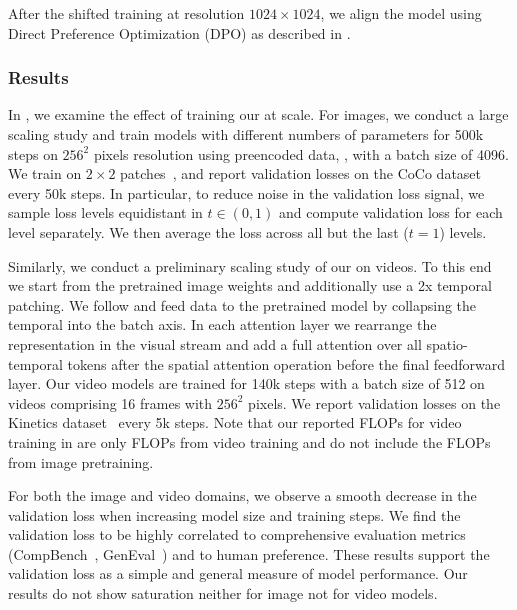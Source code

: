 After the shifted training at resolution $1024 \times 1024$, we align the model
using Direct Preference Optimization (DPO) as described in
.

\subsubsection{Results}\label{subsec:results}
%
%
%
\figvalscaling
In , we examine the effect of training our \modelname at scale. For images, we conduct a large scaling study and train models with different numbers of parameters for 500k steps on $256^2$ pixels resolution using preencoded data, \cf {}, with a batch size of 4096. We train on $2\times2$ patches~\citep{Peebles_2023}, and report validation losses on the CoCo dataset~\citep{Lin_2014} every 50k steps. In particular, to reduce noise in the validation loss signal, we sample loss levels equidistant in $t \in (0,1)$ and compute validation loss for each level separately. We then average the loss across all but the last ($t=1$) levels.

Similarly, we conduct a preliminary scaling study of our \modelname on videos.
To this end we start from the pretrained image weights and additionally use a
2x temporal patching. We follow \citet{blattmann2023align} and feed data to the
pretrained model by collapsing the temporal into the batch axis. In each
attention layer we rearrange the representation in the visual stream and add a
full attention over all spatio-temporal tokens after the spatial attention
operation before the final feedforward layer. Our video models are trained for
140k steps with a batch size of 512 on videos comprising 16 frames with $256^2$
pixels. We report validation losses on the Kinetics
dataset~\cite{carreira2018quo} every 5k steps. Note that our reported FLOPs for
video training in  are only FLOPs from video training and
do not include the FLOPs from image pretraining.

For both the image and video domains, we observe a smooth decrease in the
validation loss when increasing model size and training steps. We find the validation loss to be highly correlated to comprehensive evaluation metrics
(CompBench~\cite{huang2023t2i}, GenEval~\cite{ghosh2023geneval}) and to human preference.
These results support the validation loss as a simple and general measure of
model performance. Our results do not show saturation neither for image not for video models.

